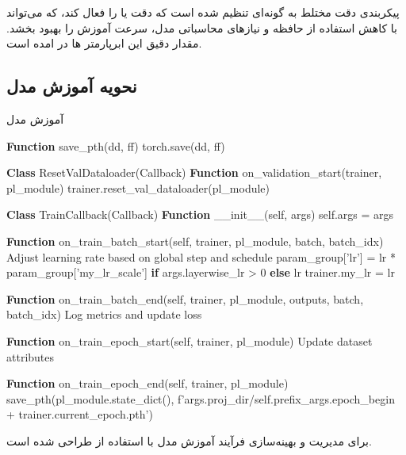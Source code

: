 پیکربندی دقت مختلط به گونه‌ای تنظیم شده است که دقت  یا  را فعال کند، که می‌تواند با کاهش استفاده از حافظه و نیازهای محاسباتی مدل، سرعت آموزش را بهبود بخشد. مقدار دقیق این ابرپارمتر ها در \xa امده است.


\subsection{نحویه آموزش مدل}
\begin{LTR}

      \begin{algorithm}
            \caption{آموزش مدل}
            \label{alg:Training}
            \setmainfont{Times New Roman}
            \begin{algorithmic}[1]
                  \State \textbf{Function} save\_pth(dd, ff)
                  \State torch.save(dd, ff)

                  \State \textbf{Class} ResetValDataloader(Callback)
                  \State \textbf{Function} on\_validation\_start(trainer, pl\_module)
                  \State trainer.reset\_val\_dataloader(pl\_module)

                  \State \textbf{Class} TrainCallback(Callback)
                  \State \textbf{Function} \_\_init\_\_(self, args)
                  \State self.args = args

                  \State \textbf{Function} on\_train\_batch\_start(self, trainer, pl\_module, batch, batch\_idx)
                  \State Adjust learning rate based on global step and schedule
                  \State param\_group['lr'] = lr * param\_group['my\_lr\_scale'] \textbf{if} args.layerwise\_lr > 0 \textbf{else} lr
                  \EndFor
                  \State trainer.my\_lr = lr

                  \State \textbf{Function} on\_train\_batch\_end(self, trainer, pl\_module, outputs, batch, batch\_idx)
                  \State Log metrics and update loss

                  \State \textbf{Function} on\_train\_epoch\_start(self, trainer, pl\_module)
                  \State Update dataset attributes

                  \State \textbf{Function} on\_train\_epoch\_end(self, trainer, pl\_module)
                  \State save\_pth(pl\_module.state\_dict(), f'{args.proj\_dir}/{self.prefix}\_{args.epoch\_begin + trainer.current\_epoch}.pth')
                  \EndIf
            \end{algorithmic}
      \end{algorithm}
\end{LTR}
  برای مدیریت و بهینه‌سازی فرآیند آموزش  مدل
با استفاده از  \cite{Falcon_PyTorch_Lightning_2019}
طراحی شده است.

